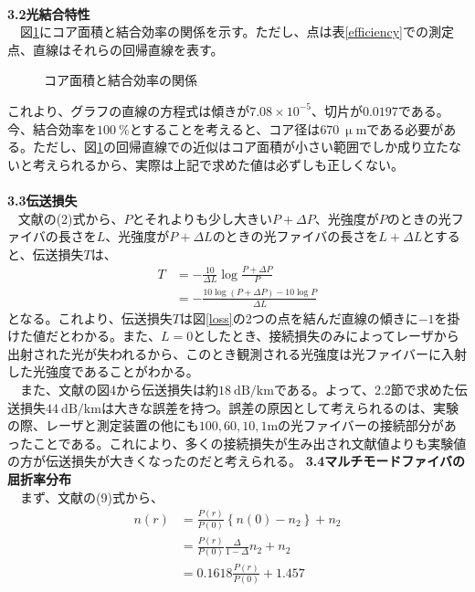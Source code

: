 \documentclass[a4paper,10.5pt]{ltjsarticle}
\begin{document}
\\
{\large \bfseries 3.2光結合特性}\\
　図\ref{core-efficiency}にコア面積と結合効率の関係を示す。ただし、点は表\ref{efficiency}での測定点、直線はそれらの回帰直線を表す。
\begin{figure}[h]
  \centering
  
  \vspace{-30pt}\caption{コア面積と結合効率の関係}
  \label{core-efficiency}
\end{figure}
これより、グラフの直線の方程式は傾きが$7.08\times 10^{-5}$、切片が$0.0197$である。今、結合効率を$100\ \%$とすることを考えると、コア径は$670\ \mathrm{\upmu m}$である必要がある。ただし、図\ref{core-efficiency}の回帰直線での近似はコア面積が小さい範囲でしか成り立たないと考えられるから、実際は上記で求めた値は必ずしも正しくない。\\
\\
{\large \bfseries 3.3伝送損失}\\
  文献\cite{text}の(2)式から、$P$とそれよりも少し大きい$P+\Delta P$、光強度が$P$のときの光ファイバの長さを$L$、光強度が$P+\Delta L$のときの光ファイバの長さを$L+\Delta L$とすると、伝送損失$T$は、
\begin{align}
  T&=-\frac{10}{\Delta L}\log{\frac{P+\Delta P}{P}}\nonumber\\[10pt]
  &=-\frac{10\log{(P+\Delta P)}-10\log{P}}{\Delta L}
\end{align}
となる。これより、伝送損失$T$は図\ref{loss}の2つの点を結んだ直線の傾きに$-1$を掛けた値だとわかる。また、$L=0$としたとき、接続損失のみによってレーザから出射された光が失われるから、このとき観測される光強度は光ファイバーに入射した光強度であることがわかる。\\
　また、文献\cite{text}の図4から伝送損失は約$18\ \mathrm{dB/km}$である。よって、2.2節で求めた伝送損失$44\ \mathrm{dB/km}$は大きな誤差を持つ。誤差の原因として考えられるのは、実験の際、レーザと測定装置の他にも$100,60,10,1 \mathrm{m}$の光ファイバーの接続部分があったことである。これにより、多くの接続損失が生み出され文献値よりも実験値の方が伝送損失が大きくなったのだと考えられる。
\clearpage
{\large \bfseries 3.4マルチモードファイバの屈折率分布}\\
　まず、文献\cite{text}の(9)式から、
\begin{align}
  n(r)&=\frac{P(r)}{P(0)}\left\{n(0)-n_2\right\}+n_2\nonumber\\[10pt]
  &=\frac{P(r)}{P(0)}\frac{\Delta}{1-\Delta}n_2+n_2\nonumber\\[10pt]
  &=0.1618\frac{P(r)}{P(0)}+1.457
\end{align}
\end{document}
